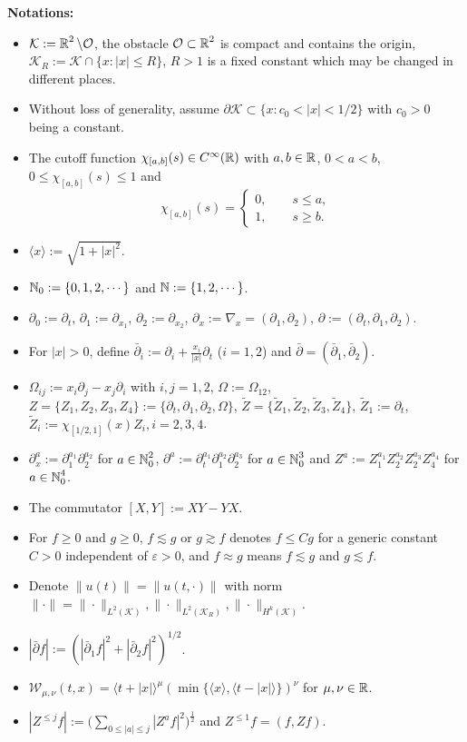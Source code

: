 \documentclass[11pt,twoside]{article}
\def\cK{\mathcal K}
\def\cO{\mathcal O}
\def\cW{\mathcal W}
\def\N{\mathop{\mathbb N\kern 0pt}\nolimits}
\def\R{\mathop{\mathbb R\kern 0pt}\nolimits}
\def\ds{\displaystyle}
\def\p{\partial}
\def\ve{\varepsilon}
\def\ls{\lesssim}
\def\gt{\gtrsim}
\newcommand{\w}[1]{\langle {#1} \rangle}
\theoremstyle{plain}
\theoremstyle{definition}
\numberwithin{equation}{section}
\begin{document}
\noindent \textbf{Notations:}
\begin{itemize}
  \item $\cK:=\R^2\setminus\cO$, the obstacle $\cO\subset\R^2$ is compact and contains the origin,
  $\cK_R:=\cK\cap\{x: |x|\le R\}$, $R>1$ is a fixed constant which may be changed in different places.
  \item Without loss of generality, assume $\p\cK\subset\{x:c_0<|x|<1/2\}$ with $c_0>0$ being a constant.
  \item The cutoff function $\chi_{[a,b]}(s)\in C^\infty(\R)$ with $a,b\in\R$, $0<a<b$, $0\le\chi_{[a,b]}(s)\le1$ and
  \begin{equation*}
    \chi_{[a,b]}(s)=\left\{
    \begin{aligned}
    0,\qquad s\le a,\\
    1,\qquad s\ge b.
    \end{aligned}
    \right.
  \end{equation*}
  \item $\w{x}:=\sqrt{1+|x|^2}$.
  \item $\N_0:=\{0,1,2,\cdots\}$ and $\N:=\{1,2,\cdots\}$.
  \item $\p_0:=\p_t$, $\p_1:=\p_{x_1}$, $\p_2:=\p_{x_2}$, $\p_x:=\nabla_x=(\p_1,\p_2)$, $\p:=(\p_t,\p_1,\p_2)$.
  \item For $|x|>0$, define $\bar\p_i:=\p_i+\frac{x_i}{|x|}\p_t$ ($i=1,2$) and $\bar\p=(\bar\p_1,\bar\p_2)$.
  \item $\Omega_{ij}:=x_i\p_j-x_j\p_i$ with $i,j=1,2$, $\Omega:=\Omega_{12}$,  $Z=\{Z_1,Z_2,Z_3,Z_4\}:=\{\p_t,\p_1,\p_2,\Omega\}$,
  $\tilde Z=\{\tilde Z_1,\tilde Z_2,\tilde Z_3,\tilde Z_4\}$, $\tilde Z_1:=\p_t$, $\tilde Z_i:=\chi_{[1/2,1]}(x)Z_i,i=2,3,4$.
  \item $\p_x^a:=\p_1^{a_1}\p_2^{a_2}$ for $a\in\N_0^2$, $\p^a:=\p_t^{a_1}\p_1^{a_2}\p_2^{a_3}$ for $a\in\N_0^3$
      and $Z^a:=Z_1^{a_1}Z_2^{a_2}Z_2^{a_3}Z_4^{a_4}$ for $a\in\N_0^4$.
  \item The commutator $[X,Y]:=XY-YX$.
  \item For $f\ge0$ and $g\ge0$, $f\ls g$ or $g\gt f$ denotes $f\le Cg$ for a generic constant $C>0$ independent of $\ve>0$,
  and $f\approx g$ means $f\ls g$ and $g\ls f$.
  \item Denote $\|u(t)\|=\|u(t,\cdot)\|$ with norm $\|\cdot\|=\|\cdot\|_{L^2(\cK)},\|\cdot\|_{L^2(\cK_R)},\|\cdot\|_{H^k(\cK)}$.
  \item $|\bar\p f|:=(|\bar\p_1f|^2+|\bar\p_2f|^2)^{1/2}$.
  \item $\cW_{\mu,\nu}(t,x)=\w{t+|x|}^\mu(\min\{\w{x},\w{t-|x|}\})^\nu$ for $\mu, \nu\in\Bbb R$.
  \item $\ds|Z^{\le j}f|:=\big(\sum_{0\le|a|\le j}|Z^af|^2\big)^\frac12$ and $Z^{\le1}f=(f,Zf)$.
\end{itemize}
\end{document}
